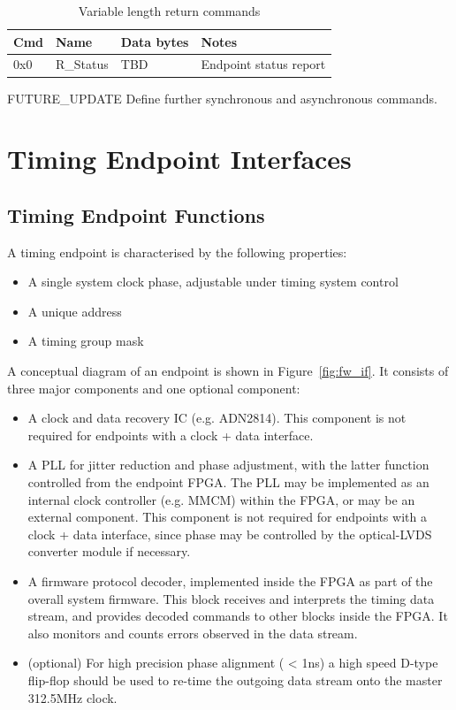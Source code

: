 \documentclass[a4paper,11pt]{article}
\begin{document}
\begin{table}[h!]
  \centering
  \begin{tabular}{@{}lllp{9cm}@{}} \toprule
    Cmd & Name & Data bytes & Notes\\ \midrule
    0x0 & R\_Status & TBD & Endpoint status report \\ \bottomrule
  \end{tabular}
  \caption{Variable length return commands}
  \label{tab:async_ret_cmds}
\end{table}

{\color{red}FUTURE\_UPDATE} Define further synchronous and asynchronous commands.

\section{Timing Endpoint Interfaces}

\subsection{Timing Endpoint Functions}

A timing endpoint is characterised by the following properties:

\begin{itemize}
	\item A single system clock phase, adjustable under timing system control
	\item A unique address
	\item A timing group mask
\end{itemize}

A conceptual diagram of an endpoint is shown in Figure~\ref{fig:fw_if}. It consists of three major components and one optional component:

\begin{itemize}
	\item A clock and data recovery IC (e.g. ADN2814). This component is not required for endpoints with a clock + data interface.
	\item A PLL for jitter reduction and phase adjustment, with the latter function controlled from the endpoint FPGA. The PLL may be implemented as an internal clock controller (e.g. MMCM) within the FPGA, or may be an external component. This component is not required for endpoints with a clock + data interface, since phase may be controlled by the optical-LVDS converter module if necessary.
	\item A firmware protocol decoder, implemented inside the FPGA as part of the overall system firmware. This block receives and interprets the timing data stream, and provides decoded commands to other blocks inside the FPGA. It also monitors and counts errors observed in the data stream.
	\item(optional) For high precision phase alignment ( < 1ns) a high speed D-type flip-flop should be used to re-time the outgoing data stream onto the master 312.5MHz clock.
\end{itemize}
\end{document}
